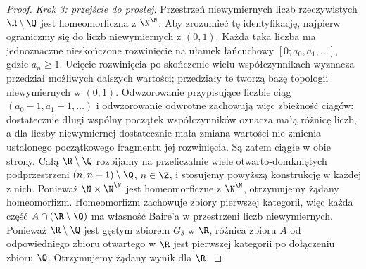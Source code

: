 \begin{proof}
\emph{Krok 3: przejście do prostej.}
Przestrzeń niewymiernych liczb rzeczywistych
$\R\setminus\Q$ jest homeomorficzna z $\N^\N$.
Aby zrozumieć tę identyfikację, najpierw ograniczmy się
do liczb niewymiernych z $(0,1)$. Każda taka liczba
ma jednoznaczne nieskończone rozwinięcie na ułamek
łańcuchowy $[0;a_0,a_1,\ldots]$, gdzie $a_n\geq1$.
Ucięcie rozwinięcia po skończenie wielu współczynnikach
wyznacza przedział możliwych dalszych wartości;
przedziały te tworzą bazę topologii niewymiernych
w $(0,1)$. Odwzorowanie przypisujące liczbie ciąg
$(a_0-1,a_1-1,\ldots)$ i odwzorowanie odwrotne
zachowują więc zbieżność ciągów: dostatecznie długi
wspólny początek współczynników oznacza małą różnicę
liczb, a dla liczby niewymiernej dostatecznie mała
zmiana wartości nie zmienia ustalonego początkowego
fragmentu jej rozwinięcia. Są zatem ciągłe w obie strony.
Całą $\R\setminus\Q$ rozbijamy na przeliczalnie wiele
otwarto-domkniętych podprzestrzeni $(n,n+1)\setminus\Q$,
$n\in\Z$, i stosujemy powyższą konstrukcję w każdej
z nich. Ponieważ $\N\times\N^\N$ jest homeomorficzne
z $\N^\N$, otrzymujemy żądany homeomorfizm.
Homeomorfizm zachowuje zbiory pierwszej kategorii,
więc każda część $A\cap(\R\setminus\Q)$ ma własność
Baire'a w przestrzeni liczb niewymiernych. Ponieważ
$\R\setminus\Q$ jest gęstym zbiorem $G_\delta$
w $\R$, różnica zbioru $A$ od odpowiedniego zbioru
otwartego w $\R$ jest pierwszej kategorii po dołączeniu
zbioru $\Q$. Otrzymujemy żądany wynik dla $\R$.
\end{proof}


